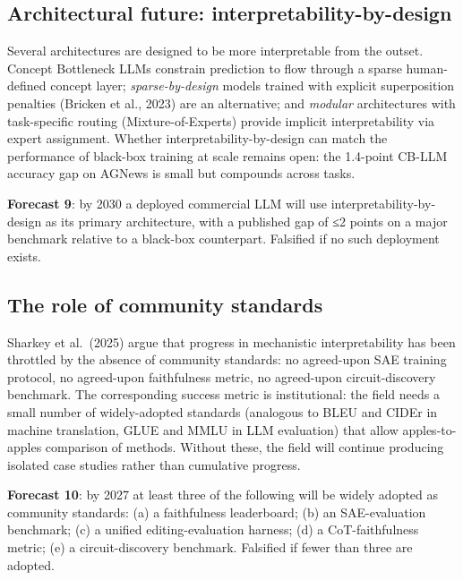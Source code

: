 \documentclass{article}
\begin{document}
\subsection{Architectural future: interpretability-by-design}\label{architectural-future-interpretability-by-design}

Several architectures are designed to be more interpretable from the outset. Concept Bottleneck LLMs \citep{sun2024craftinglargelangu} constrain prediction to flow through a sparse human-defined concept layer; \emph{sparse-by-design} models trained with explicit superposition penalties (Bricken et al., 2023) are an alternative; and \emph{modular} architectures with task-specific routing (Mixture-of-Experts) provide implicit interpretability via expert assignment. Whether interpretability-by-design can match the performance of black-box training at scale remains open: the 1.4-point CB-LLM accuracy gap on AGNews is small but compounds across tasks.

\textbf{Forecast 9}: by 2030 a deployed commercial LLM will use interpretability-by-design as its primary architecture, with a published gap of ≤2 points on a major benchmark relative to a black-box counterpart. Falsified if no such deployment exists.

\subsection{The role of community standards}\label{the-role-of-community-standards}

Sharkey et al.~(2025) argue that progress in mechanistic interpretability has been throttled by the absence of community standards: no agreed-upon SAE training protocol, no agreed-upon faithfulness metric, no agreed-upon circuit-discovery benchmark. The corresponding success metric is institutional: the field needs a small number of widely-adopted standards (analogous to BLEU and CIDEr in machine translation, GLUE and MMLU in LLM evaluation) that allow apples-to-apples comparison of methods. Without these, the field will continue producing isolated case studies rather than cumulative progress.

\textbf{Forecast 10}: by 2027 at least three of the following will be widely adopted as community standards: (a) a faithfulness leaderboard; (b) an SAE-evaluation benchmark; (c) a unified editing-evaluation harness; (d) a CoT-faithfulness metric; (e) a circuit-discovery benchmark. Falsified if fewer than three are adopted.
\end{document}
